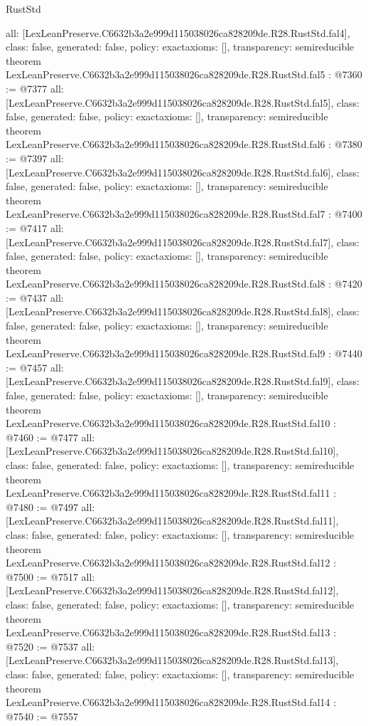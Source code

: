 \begin{lexlean}{RustStd}
\begin{coremodule}
{  all: [LexLeanPreserve.C6632b3a2e999d115038026ca828209de.R28.RustStd.fal4],
  class: false,
  generated: false,
  policy: exact{axioms: []},
  transparency: semireducible
}
theorem LexLeanPreserve.C6632b3a2e999d115038026ca828209de.R28.RustStd.fal5 : @7360 := @7377 {
  all: [LexLeanPreserve.C6632b3a2e999d115038026ca828209de.R28.RustStd.fal5],
  class: false,
  generated: false,
  policy: exact{axioms: []},
  transparency: semireducible
}
theorem LexLeanPreserve.C6632b3a2e999d115038026ca828209de.R28.RustStd.fal6 : @7380 := @7397 {
  all: [LexLeanPreserve.C6632b3a2e999d115038026ca828209de.R28.RustStd.fal6],
  class: false,
  generated: false,
  policy: exact{axioms: []},
  transparency: semireducible
}
theorem LexLeanPreserve.C6632b3a2e999d115038026ca828209de.R28.RustStd.fal7 : @7400 := @7417 {
  all: [LexLeanPreserve.C6632b3a2e999d115038026ca828209de.R28.RustStd.fal7],
  class: false,
  generated: false,
  policy: exact{axioms: []},
  transparency: semireducible
}
theorem LexLeanPreserve.C6632b3a2e999d115038026ca828209de.R28.RustStd.fal8 : @7420 := @7437 {
  all: [LexLeanPreserve.C6632b3a2e999d115038026ca828209de.R28.RustStd.fal8],
  class: false,
  generated: false,
  policy: exact{axioms: []},
  transparency: semireducible
}
theorem LexLeanPreserve.C6632b3a2e999d115038026ca828209de.R28.RustStd.fal9 : @7440 := @7457 {
  all: [LexLeanPreserve.C6632b3a2e999d115038026ca828209de.R28.RustStd.fal9],
  class: false,
  generated: false,
  policy: exact{axioms: []},
  transparency: semireducible
}
theorem LexLeanPreserve.C6632b3a2e999d115038026ca828209de.R28.RustStd.fal10 : @7460 := @7477 {
  all: [LexLeanPreserve.C6632b3a2e999d115038026ca828209de.R28.RustStd.fal10],
  class: false,
  generated: false,
  policy: exact{axioms: []},
  transparency: semireducible
}
theorem LexLeanPreserve.C6632b3a2e999d115038026ca828209de.R28.RustStd.fal11 : @7480 := @7497 {
  all: [LexLeanPreserve.C6632b3a2e999d115038026ca828209de.R28.RustStd.fal11],
  class: false,
  generated: false,
  policy: exact{axioms: []},
  transparency: semireducible
}
theorem LexLeanPreserve.C6632b3a2e999d115038026ca828209de.R28.RustStd.fal12 : @7500 := @7517 {
  all: [LexLeanPreserve.C6632b3a2e999d115038026ca828209de.R28.RustStd.fal12],
  class: false,
  generated: false,
  policy: exact{axioms: []},
  transparency: semireducible
}
theorem LexLeanPreserve.C6632b3a2e999d115038026ca828209de.R28.RustStd.fal13 : @7520 := @7537 {
  all: [LexLeanPreserve.C6632b3a2e999d115038026ca828209de.R28.RustStd.fal13],
  class: false,
  generated: false,
  policy: exact{axioms: []},
  transparency: semireducible
}
theorem LexLeanPreserve.C6632b3a2e999d115038026ca828209de.R28.RustStd.fal14 : @7540 := @7557 {
}
\end{coremodule}
\end{lexlean}
